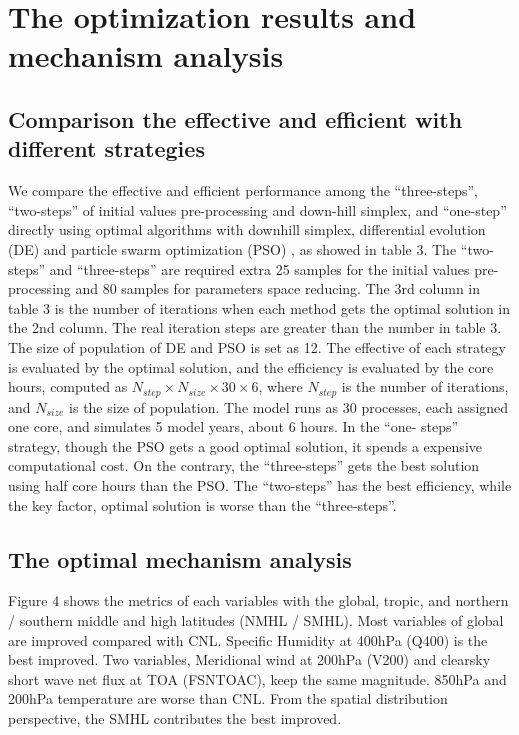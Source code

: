 \documentclass[gmd, manuscript]{copernicus}
\begin{document}
\section{The optimization results and mechanism analysis}

\subsection{Comparison the effective and efficient with different strategies}

We compare the effective and efficient performance among the ``three-steps'', ``two-steps'' of
initial values pre-processing and down-hill simplex, and ``one-step'' directly using optimal
algorithms with downhill simplex, differential evolution (DE) and particle swarm optimization (PSO)
, as showed in table 3. The ``two-steps'' and ``three-steps'' are required extra 25 samples for the
initial values pre-processing and 80 samples for parameters space reducing. The 3rd column in table
3 is the number of iterations when each method gets the optimal solution in the 2nd column. The
real iteration steps are greater than the number in table 3. The size of population of DE and PSO
is set as 12. The effective of each strategy is evaluated by the optimal solution, and the
efficiency is evaluated by the core hours, computed as $N_{step} \times N_{size} \times 30 \times 6
$, where $N_{step}$ is the number of iterations, and $N_{size}$ is the size of population. The
model runs as 30 processes, each assigned one core, and simulates 5 model years, about 6 hours. In
the ``one- steps'' strategy, though the PSO gets a good optimal solution, it spends a expensive
computational cost. On the contrary, the ``three-steps'' gets the best solution using half core
hours than the PSO. The ``two-steps'' has the best efficiency, while the key factor, optimal
solution is worse than the ``three-steps''.

\subsection{The optimal mechanism analysis}

Figure 4 shows the metrics of each variables with the global, tropic, and northern / southern
middle and high latitudes (NMHL / SMHL). Most variables of global are improved compared with CNL.
Specific Humidity at 400hPa (Q400) is the best improved. Two variables, Meridional wind at 200hPa
(V200) and clearsky short wave net flux at TOA (FSNTOAC), keep the same magnitude. 850hPa and
200hPa temperature are worse than CNL. From the spatial distribution perspective, the SMHL
contributes the best improved.
\end{document}
